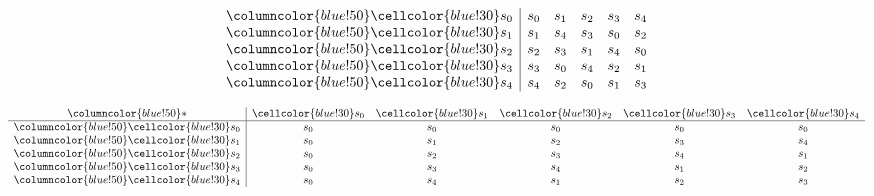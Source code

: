 \documentclass{article}
\begin{document}
\begin{center}
\begin{minipage}{0.23\textwidth}
\[\begin{array}{>{\columncolor{blue!50}}c|ccccc}
    \cellcolor{blue!30}s_0 & s_0 & s_1 & s_2 & s_3 & s_4 \\
    \cellcolor{blue!30}s_1 & s_1 & s_4 & s_3 & s_0 & s_2 \\
    \cellcolor{blue!30}s_2 & s_2 & s_3 & s_1 & s_4 & s_0 \\
    \cellcolor{blue!30}s_3 & s_3 & s_0 & s_4 & s_2 & s_1 \\
    \cellcolor{blue!30}s_4 & s_4 & s_2 & s_0 & s_1 & s_3 \\
    \end{array}
    \]
\end{minipage}%
\hfill
\begin{minipage}{0.23\textwidth}
    \centering
    \small{}
    \renewcommand{\arraystretch}{1} 
    \[
    \begin{array}{>{\columncolor{blue!50}}c|ccccc}
    * & \cellcolor{blue!30}s_0 & \cellcolor{blue!30}s_1 & \cellcolor{blue!30}s_2 & \cellcolor{blue!30}s_3 & \cellcolor{blue!30}s_4 \\ \hline
    \cellcolor{blue!30}s_0 & s_0 & s_0 & s_0 & s_0 & s_0 \\
    \cellcolor{blue!30}s_1 & s_0 & s_1 & s_2 & s_3 & s_4 \\
    \cellcolor{blue!30}s_2 & s_0 & s_2 & s_3 & s_4 & s_1 \\
    \cellcolor{blue!30}s_3 & s_0 & s_3 & s_4 & s_1 & s_2 \\
    \cellcolor{blue!30}s_4 & s_0 & s_4 & s_1 & s_2 & s_3 \\
    \end{array}
    \]
\end{minipage}%
\end{center}
\end{document}
